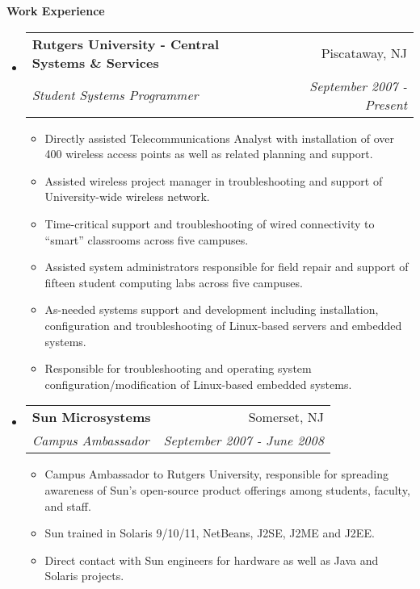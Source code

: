 \documentclass[letterpaper,11pt]{article}
\makeatletter
\newcommand{\resitem}[1]{\item #1 \vspace{-2pt}}
\newcommand{\resheading}[1]{{\large \colorbox{mygrey}{\begin{minipage}{\textwidth}{\textbf{#1 \vphantom{p\^{E}}}}\end{minipage}}}}
\newcommand{\ressubheading}[4]{
\begin{tabular*}{7.0in}{l@{\extracolsep{\fill}}r}
		\textbf{#1} & #2 \\
		\textit{#3} & \textit{#4} \\
\end{tabular*}\vspace{-6pt}}
\makeatother
\begin{document}
\resheading{Work Experience}
\begin{itemize}
\item
	\ressubheading{Rutgers University - Central Systems \& Services}{Piscataway, NJ}{Student Systems Programmer}{September 2007 - Present}
	\begin{itemize}
                \resitem{Directly assisted Telecommunications Analyst with
                  installation of over 400 wireless access
                  points as well as related planning and support.}
                \resitem{Assisted wireless project manager in troubleshooting
                  and support of University-wide wireless network.}
                \resitem{Time-critical support and troubleshooting of wired
                  connectivity to ``smart'' classrooms across five campuses.}
                \resitem{Assisted system administrators responsible for field repair and support of fifteen student computing
                  labs across five campuses.}
                \resitem{As-needed systems support and development including
                  installation, configuration and troubleshooting of 
                  Linux-based servers and embedded systems.}
                \resitem{Responsible for troubleshooting and operating system
                  configuration/modification of Linux-based embedded systems.}
	\end{itemize}

\item
        \ressubheading{Sun Microsystems}{Somerset, NJ}{Campus Ambassador}{September 2007 - June 2008}
        \begin{itemize}
                \resitem{Campus Ambassador to Rutgers University, responsible
                  for spreading awareness of Sun's open-source product
                  offerings among students, faculty, and staff.}
                \resitem{Sun trained in Solaris 9/10/11,
                  NetBeans, J2SE, J2ME and J2EE. }
                \resitem{Direct contact with Sun engineers for hardware as
                  well as Java and Solaris projects.}
        \end{itemize}


\end{itemize}
\end{document}
